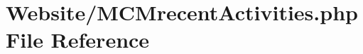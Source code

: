 \hypertarget{_m_c_mrecent_activities_8php}{\section{Website/\-M\-C\-Mrecent\-Activities.php File Reference}
\label{_m_c_mrecent_activities_8php}
}
